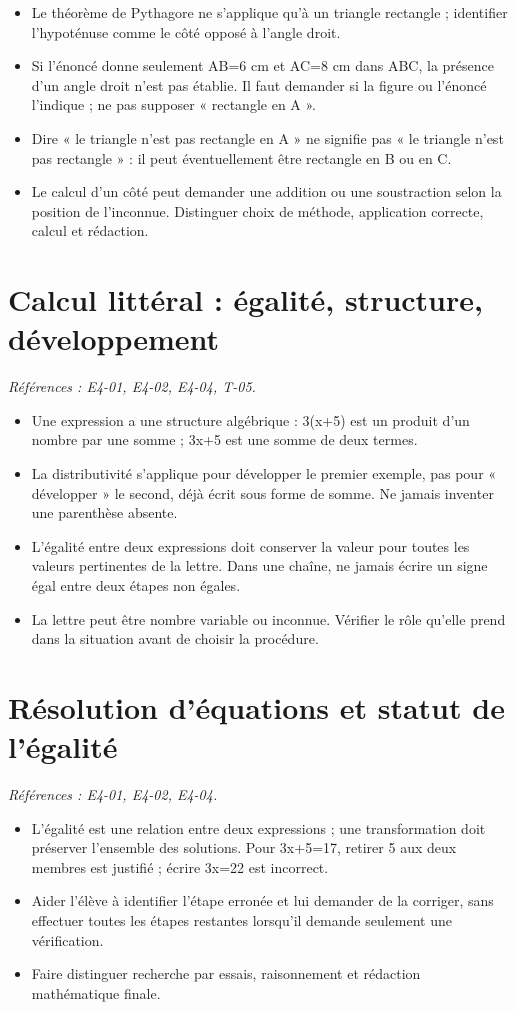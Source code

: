 \documentclass[11pt,a4paper]{article}
\newcommand{\sectionref}[2]{\section{#1}\textit{Références : #2.}\par}
\begin{document}
\begin{itemize}
\item Le théorème de Pythagore ne s’applique qu’à un triangle rectangle ; identifier l’hypoténuse comme le côté opposé à l’angle droit.
\item Si l’énoncé donne seulement AB=6 cm et AC=8 cm dans ABC, la présence d’un angle droit n’est pas établie. Il faut demander si la figure ou l’énoncé l’indique ; ne pas supposer « rectangle en A ».
\item Dire « le triangle n’est pas rectangle en A » ne signifie pas « le triangle n’est pas rectangle » : il peut éventuellement être rectangle en B ou en C.
\item Le calcul d’un côté peut demander une addition ou une soustraction selon la position de l’inconnue. Distinguer choix de méthode, application correcte, calcul et rédaction.
\end{itemize}
\sectionref{Calcul littéral : égalité, structure, développement}{E4-01, E4-02, E4-04, T-05}
\begin{itemize}
\item Une expression a une structure algébrique : 3(x+5) est un produit d’un nombre par une somme ; 3x+5 est une somme de deux termes.
\item La distributivité s’applique pour développer le premier exemple, pas pour « développer » le second, déjà écrit sous forme de somme. Ne jamais inventer une parenthèse absente.
\item L’égalité entre deux expressions doit conserver la valeur pour toutes les valeurs pertinentes de la lettre. Dans une chaîne, ne jamais écrire un signe égal entre deux étapes non égales.
\item La lettre peut être nombre variable ou inconnue. Vérifier le rôle qu’elle prend dans la situation avant de choisir la procédure.
\end{itemize}
\sectionref{Résolution d’équations et statut de l’égalité}{E4-01, E4-02, E4-04}
\begin{itemize}
\item L’égalité est une relation entre deux expressions ; une transformation doit préserver l’ensemble des solutions. Pour 3x+5=17, retirer 5 aux deux membres est justifié ; écrire 3x=22 est incorrect.
\item Aider l’élève à identifier l’étape erronée et lui demander de la corriger, sans effectuer toutes les étapes restantes lorsqu’il demande seulement une vérification.
\item Faire distinguer recherche par essais, raisonnement et rédaction mathématique finale.
\end{itemize}
\end{document}
